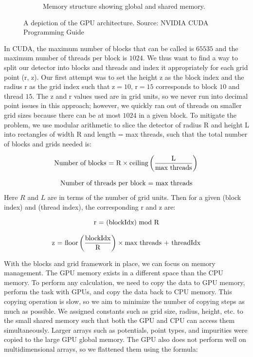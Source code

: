 \begin{figure}
\begin{subfigure}{0.48\textwidth}
 \caption{Memory structure showing global and shared memory.} \label{fig:GPU_basics_b}
 \end{subfigure}
\caption{A depiction of the GPU architecture. Source: NVIDIA CUDA {\cpp}  Programming Guide} \label{fig:GPU_basics}
\end{figure}

In CUDA, the maximum number of blocks that can be called is $65535$ and the maximum number of threads per block is $1024$. We thus want to find a way to split our detector into blocks and threads and index it appropriately for each grid point (r, z). Our first attempt was to set the height z as the block index and the radius r as the grid index such that z$=10$, r$=15$ corresponds to block $10$ and thread $15$. The z and r values used are in grid units, so we never run into decimal point issues in this approach; however, we quickly ran out of threads on smaller grid sizes because there can be at most $1024$ in a given block. To mitigate the problem, we use modular arithmetic to slice the detector of radius R and height L into rectangles of width R and length = max threads, such that the total number of blocks and grids needed is:

\begin{equation}{\label{nu_b}}
 \text{Number of blocks = R}\times \text{ceiling} \left( \frac{\text{L}}{\text{max threads}} \right) \\
\end{equation}

\begin{equation}{\label{nu_g}}
 \text{Number of threads per block = max threads}
\end{equation}
Here $R$ and $L$ are in terms of the number of grid units. Then for a given (block index) and (thread index), the corresponding r and z are:

\begin{equation}{\label{r_eq}}
 \text{r = (blockIdx) mod R} \\
\end{equation}

\begin{equation}{\label{z_eq}}
 \text{z = floor}\left(\frac{\text{blockIdx}}{\text{R}}\right) \times \text{max threads + threadIdx}
\end{equation}

With the blocks and grid framework in place, we can focus on memory management. The GPU memory exists in a different space than the CPU memory. To perform any calculation, we need to copy the data to GPU memory, perform the task with GPUs, and copy the data back to CPU memory. This copying operation is slow, so we aim to minimize the number of copying steps as much as possible. We assigned constants such as grid size, radius, height, etc. to the small shared memory such that both the GPU and CPU can access them simultaneously. Larger arrays such as potentials, point types, and impurities were copied to the large GPU global memory. The GPU also does not perform well on multidimensional arrays, so we flattened them using the formula:

